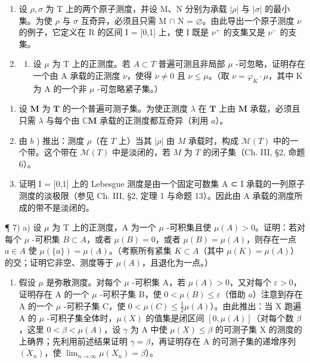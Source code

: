 \begin{enumerate}
\def\labelenumi{\arabic{enumi})}
\setcounter{enumi}{4}
\item
  设 \(\rho, \sigma\) 为 T 上的两个原子测度，并设 M、N 分别为承载 \(|\rho|\) 与 \(|\sigma|\) 的最小集。为使 \(\rho\) 与 \(\sigma\) 互奇异，必须且只需 M \(\cap\) N = \(\varnothing\)。由此导出一个原子测度 \(\nu\) 的例子，它定义在 R 的区间 I = {[}0,1{]} 上，使 I 既是 \(\nu^{+}\) 的支集又是 \(\nu^{-}\) 的支集。
\item
  \begin{enumerate}
  \def\labelenumii{\alph{enumii})}
  \tightlist
  \item
    设 \(\mu\) 为 T 上的正测度。若 \(A \subset T\) 普遍可测且非局部 \(\mu\) -可忽略，证明存在一个由 A 承载的正测度 \(\nu\)，使得 \(\nu \neq 0\) 且 \(\nu \leqslant \mu\)。（取 \(\nu = \varphi_{K} \cdot \mu\)，其中 K 为 A 的一个非 \(\mu\) -可忽略紧子集。）
  \end{enumerate}
\end{enumerate}

\begin{enumerate}
\def\labelenumi{\alph{enumi})}
\setcounter{enumi}{1}
\item
  设 \(\mathbf{M}\) 为 \(\mathbf{T}\) 的一个普遍可测子集。为使正测度 \(\lambda\) 在 \(\mathbf{T}\) 上由 \(\mathbf{M}\) 承载，必须且只需 \(\lambda\) 与每个由 \(\mathbb{C}\mathbf{M}\) 承载的正测度都互奇异（利用 \(a\)）。
\item
  由 \(b\) ) 推出：测度 \(\rho\)（在 \(T\) 上）当其 \(|\rho|\) 由 \(M\) 承载时，构成 \(\mathcal{M}(T)\) 中的一个带。这个带在 \(\mathcal{M}(T)\) 中是淡闭的，若 \(M\) 为 \(T\) 的闭子集（Ch. III, §2, 命题 6）。
\item
  证明 I = {[}0,1{]} 上的 Lebesgue 测度是由一个固定可数集 A ⊂ I 承载的一列原子测度的淡极限（参见 Ch. III, §2, 定理 1 与命题 13）。因此由 A 承载的测度所成的带不是淡闭的。
\end{enumerate}

¶ 7) a) 设 \(\mu\) 为 T 上的正测度，A 为一个 \(\mu\) -可积集且使 \(\mu(A) > 0\)。证明：若对每个 \(\mu\) -可积集 \(B \subset A\)，或者 \(\mu(B) = 0\)，或者 \(\mu(B) = \mu(A)\)，则存在一点 \(a \in A\) 使 \(\mu(\{a\}) = \mu(A)\)。（考察所有紧集 \(K \subset A\)（其中 \(\mu(K) = \mu(A)\)）的交；证明它非空、测度等于 \(\mu(A)\)，且退化为一点。）

\begin{enumerate}
\def\labelenumi{\alph{enumi})}
\setcounter{enumi}{1}
\tightlist
\item
  假设 \(\mu\) 是弥散测度。对每个 \(\mu\) -可积集 A，若 \(\mu(A) > 0\)，又对每个 \(\varepsilon > 0\)，证明存在 A 的一个 \(\mu\) -可积子集 B，使 \(0 < \mu(B) \leqslant \varepsilon\)（借助 \(a\)）注意到存在 A 的一个 \(\mu\) -可积子集 C，使 \(0 < \mu(C) \leqslant \frac{1}{2} \mu(A)\)）。由此推出：当 X 跑遍 A 的 \(\mu\) -可积子集全体时，\(\mu(X)\) 的值集是闭区间 \([0, \mu(A)]\)（对每个数 \(\beta\)，这里 \(0 < \beta < \mu(A)\)，设 \(\gamma\) 为 A 中使 \(\mu(X) \leqslant \beta\) 的可测子集 X 的测度的上确界；先利用前述结果证明 \(\gamma = \beta\)，再证明存在 A 的可测子集的递增序列 \((X_n)\)，使 \(\lim_{n \to \infty} \mu(X_n) = \beta\)）。
\end{enumerate}


